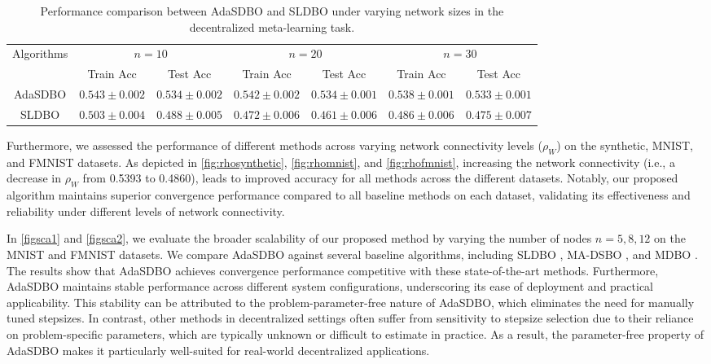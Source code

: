 \documentclass{article}
\theoremstyle{plain}
\theoremstyle{definition}
\theoremstyle{remark}
\begin{document}
\begin{table}[t]
\centering
\small 
\setlength{\tabcolsep}{3pt} 
\caption{Performance comparison between AdaSDBO and SLDBO under varying network sizes in the decentralized meta-learning task.}
\label{tab:convergence_agents}
\begin{tabular}{ccccccc}
\toprule
\multirow{2}{*}{Algorithms} & \multicolumn{2}{c}{$n = 10$} & \multicolumn{2}{c}{$n = 20$} & \multicolumn{2}{c}{$n = 30$} \\
\cmidrule(lr){2-3} \cmidrule(lr){4-5} \cmidrule(lr){6-7}
 & Train Acc & Test Acc & Train Acc & Test Acc & Train Acc & Test Acc \\
\midrule
AdaSDBO & $0.543 \pm 0.002$ & $0.534 \pm 0.002$ & $0.542 \pm 0.002$ & $0.534 \pm 0.001$ & $0.538 \pm 0.001$ & $0.533 \pm 0.001$ \\
SLDBO & $0.503 \pm 0.004$ & $0.488 \pm 0.005$ & $0.472 \pm 0.006$ & $0.461 \pm 0.006$ & $0.486 \pm 0.006$ & $0.475 \pm 0.007$ \\
\bottomrule
\end{tabular}
\label{numbermetatestn102030}
\end{table}

Furthermore, we assessed the performance of different methods across varying network connectivity levels (\(\rho_W\)) on the synthetic, MNIST, and FMNIST datasets. As depicted in \cref{fig:rhosynthetic}, \cref{fig:rhomnist}, and \cref{fig:rhofmnist}, increasing the network connectivity ({i.e.,} a decrease in \(\rho_W\) from 0.5393 to 0.4860), leads to improved accuracy for all methods across the different datasets. Notably, our proposed algorithm maintains superior convergence performance compared to all baseline methods on each dataset, validating its effectiveness and reliability under different levels of network connectivity.

In \cref{figsca1} and \cref{figsca2}, we evaluate the broader scalability of our proposed method by varying the number of nodes \(n = 5, 8, 12\) on the MNIST and FMNIST datasets. We compare AdaSDBO against several baseline algorithms, including SLDBO \citep{dong2023single}, MA-DSBO \citep{chen2023decentralized}, and MDBO \citep{gao2023convergence}. The results show that AdaSDBO achieves convergence performance competitive with these state-of-the-art methods. Furthermore, AdaSDBO maintains stable performance across different system configurations, underscoring its ease of deployment and practical applicability.
This stability can be attributed to the problem-parameter-free nature of AdaSDBO, which eliminates the need for manually tuned stepsizes. In contrast, other methods in decentralized settings often suffer from sensitivity to stepsize selection due to their reliance on problem-specific parameters, which are typically unknown or difficult to estimate in practice. As a result, the parameter-free property of AdaSDBO makes it particularly well-suited for real-world decentralized applications.
\end{document}
